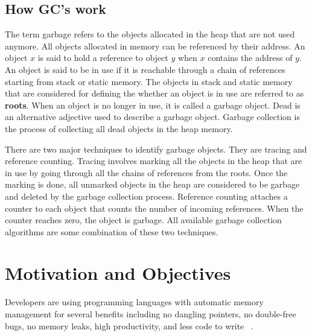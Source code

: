 \subsection{How GC's work}
The term garbage refers to the objects allocated in the heap that are not used anymore. All objects allocated in memory can be referenced by their address. An object $x$ is said to hold a reference to object $y$ when $x$ contains the address of $y$. 
An object is said to be in use if it is reachable through a chain of references starting from stack or static memory.
The objects in stack and static memory that are considered for defining the whether an object is in use are referred to as \textbf{roots}.
When an object is no longer in use, it is called a garbage object.
 Dead is an alternative adjective used to describe a garbage object. Garbage collection is the process of collecting all dead objects in the heap memory. 

There are two major techniques to identify garbage objects. They are tracing and reference counting. Tracing involves marking all the objects in the heap that are in use by going through all the chains of references from the roots. Once the marking is done, all unmarked objects in the heap are considered to be garbage and deleted by the garbage collection process. Reference counting attaches a counter to each object that counts the number of incoming references. When the counter reaches zero, the object is garbage. All available garbage collection algorithms are some combination of these two techniques.

\section{Motivation and Objectives}
\label{intro:motv}
Developers are using programming languages with automatic memory management for several benefits including no dangling pointers, no double-free bugs, no memory leaks, high productivity, and less code to write ~\cite{Butters}.  
\begin{comment}
The main advantage of the garbage collections are 
\begin{enumerate}
\item Dangling Pointers
\item Double free bugs
\item Memory Leaks
\end{enumerate}
\end{comment}

